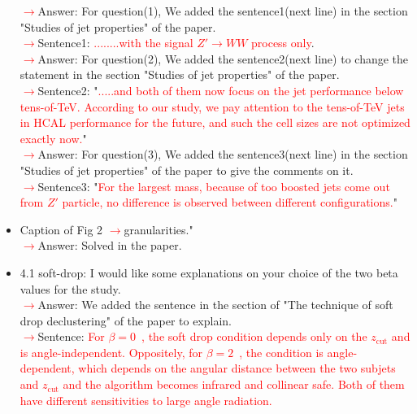 \documentclass[final,1p,11pt]{elsarticle}
\begin{document}
\begin{itemize}
 \textcolor{red}{$\rightarrow$}Answer: For question(1), We added the sentence1(next line) in the section "Studies of jet properties" of the paper.\\
 \textcolor{red}{$\rightarrow$}Sentence1: \textcolor{red}{........with the signal $Z'\rightarrow WW$ process only}.\\
  \textcolor{red}{$\rightarrow$}Answer: For question(2), We added the sentence2(next line) to change the statement in the section "Studies of jet properties" of the paper.\\
 \textcolor{red}{$\rightarrow$}Sentence2: "\textcolor{red}{.....and both of them now focus on the jet performance below tens-of-TeV. According to our study, we pay attention to the tens-of-TeV jets in HCAL performance for the future, and such the cell sizes are not optimized exactly now.}"\\
   \textcolor{red}{$\rightarrow$}Answer: For question(3), We added the sentence3(next line) in the section "Studies of jet properties" of the paper to give the comments on it.\\
 \textcolor{red}{$\rightarrow$}Sentence3: "\textcolor{red}{For the largest mass, because of too boosted jets come out from $Z'$ particle, no difference is observed between different configurations.}"\\
\item Caption of Fig 2 \textcolor{red}{$\rightarrow$}granularities."\\
 \textcolor{red}{$\rightarrow$}Answer: Solved in the paper.\\
\item 4.1 soft-drop: I would like some explanations on your choice of the two beta values for the study.\\
 \textcolor{red}{$\rightarrow$}Answer: We added the sentence in the section of "The technique of soft drop declustering" of the paper to explain.\\
 \textcolor{red}{$\rightarrow$}Sentence: \textcolor{red}{For $\beta=0$~\cite{CMS:2017wyc,Tripathee:2017ybi}, the soft drop condition 
depends only on the $z_\mathrm{cut}$ and is angle-independent. Oppositely, for $\beta=2$~\cite{Aaboud:2017qwh}, the condition is angle-dependent, which depends on 
the angular distance between the two subjets and $z_\mathrm{cut}$ and the 
algorithm becomes infrared and collinear safe. Both of them have different sensitivities to large angle radiation.}\\

\end{itemize}
\end{document}
